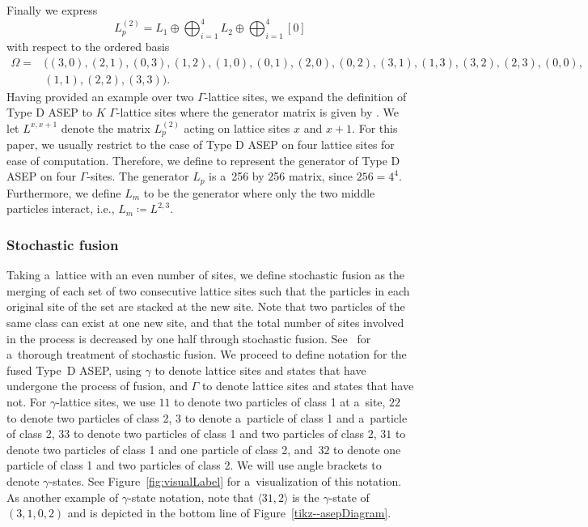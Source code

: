 \documentclass[pdftex]{sigma}
\numberwithin{equation}{section}
\theoremstyle{definition}
\begin{document}
Finally we express
\[L_p^{(2)} = L_1 \oplus \bigoplus_{i=1}^4 L_2 \oplus \bigoplus_{i=1}^4 [0]\]
with respect to the ordered basis
\begin{align*}
 \Omega ={}& ((3,0),(2,1),(0,3),(1,2),(1,0),(0,1),(2,0),(0,2),(3,1),(1,3),(3,2),(2,3),(0,0),\\ &(1,1),(2,2),(3,3) ).
\end{align*}
Having provided an example over two $\Gamma$-lattice sites, we expand the definition of Type D ASEP to $K$ $\Gamma$-lattice sites where the generator matrix is given by .
We let $L^{x,x+1}$ denote the matrix $L_p^{(2)}$ acting on lattice sites $x$ and $x+1$. For this paper, we usually restrict to the case of Type D ASEP on four lattice sites for ease of computation. Therefore, we define 
to represent the generator of Type D ASEP on four $\Gamma$-sites. The generator $L_p$ is a~256 by 256 matrix, since $256 = 4^4$. Furthermore, we define $L_m$ to be the generator where only the two middle particles interact, i.e., $L_m \coloneqq L^{2,3}$.

\subsubsection{Stochastic fusion} \label{stoch-fusion}
Taking a~lattice with an even number of sites, we define stochastic fusion as the merging of each set of two consecutive lattice sites such that the particles in each original site of the set are stacked at the new site. Note that two particles of the same class can exist at one new site, and that the total number of sites involved in the process is decreased by one half through stochastic fusion. See~\cite{kuan2019stochastic} for a~thorough treatment of stochastic fusion.
We proceed to define notation for the fused Type~D ASEP, using $\gamma$ to denote lattice sites and states that have undergone the process of fusion, and $\Gamma$ to denote lattice sites and states that have not. For $\gamma$-lattice sites, we use $11$ to denote two particles of class 1 at a~site, $22$ to denote two particles of class 2, $3$ to denote a~particle of class 1 and a~particle of class 2, $33$ to denote two particles of class 1 and two particles of class 2, $31$ to denote two particles of class 1 and one particle of class 2, and~$32$ to denote one particle of class 1 and two particles of class 2. We will use angle brackets to denote $\gamma$-states. See Figure~\ref{fig:visualLabel} for a~visualization of this notation. As another example of $\gamma$-state notation, note that $\langle 31,2 \rangle$ is the $\gamma$-state of $(3,1,0,2)$ and is depicted in the bottom line of Figure~\ref{tikz--asepDiagram}.
\end{document}
